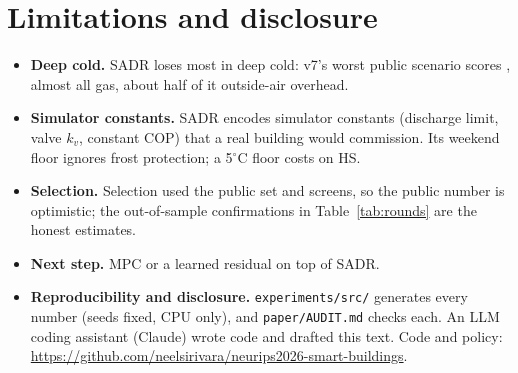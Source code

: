 \documentclass{article}
\begin{document}
\section{Limitations and disclosure}
\begin{itemize}
\item \textbf{Deep cold.} SADR loses most in deep cold: v7's worst public scenario scores \RFMaxCandScore, almost all gas, about half of it outside-air overhead.
\item \textbf{Simulator constants.} SADR encodes simulator constants (discharge limit, valve $k_v$, constant COP) that a real building would commission. Its weekend floor ignores frost protection; a 5$^\circ$C floor costs \RSixScrCTenHsRelAbs{} on HS.
\item \textbf{Selection.} Selection used the public set and screens, so the public number is optimistic; the out-of-sample confirmations in Table~\ref{tab:rounds} are the honest estimates.
\item \textbf{Next step.} MPC or a learned residual on top of SADR.
\item \textbf{Reproducibility and disclosure.} \texttt{experiments/src/} generates every number (seeds fixed, CPU only), and \texttt{paper/AUDIT.md} checks each. An LLM coding assistant (Claude) wrote code and drafted this text. Code and policy: \url{https://github.com/neelsirivara/neurips2026-smart-buildings}.
\end{itemize}



\clearpage
\appendix
\end{document}
